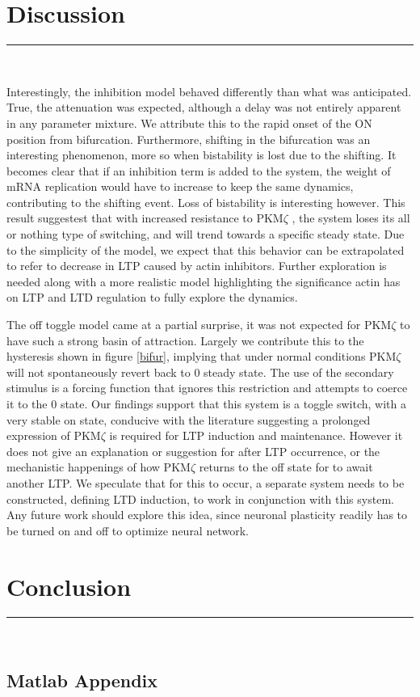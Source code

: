 \documentclass[12pt, a4paper]{article}
\newcommand{\blackbar}{{\nointerlineskip
{\rule{\linewidth}{1mm}}\\}}
\newcommand{\PK}{PKM$\zeta$ }
\newcommand{\insertMatlab}[1]{}
\begin{document}
\section*{Discussion}
\blackbar

Interestingly, the inhibition model behaved differently than what was anticipated. True, the attenuation was expected, although a delay was not entirely apparent in any parameter mixture. We attribute this to the rapid onset of the ON position from bifurcation. Furthermore, shifting in the bifurcation was an interesting phenomenon, more so when bistability is lost due to the shifting. It becomes clear that if an inhibition term is added to the system, the weight of mRNA replication would have to increase to keep the same dynamics, contributing to the shifting event. Loss of bistability is interesting however. This result suggestest that with increased resistance to \PK, the system loses its all or nothing type of switching, and will trend towards a specific steady state. Due to the simplicity of the model, we expect that this behavior can be extrapolated to refer to decrease in LTP caused by actin inhibitors. Further exploration is needed along with a more realistic model highlighting the significance actin has on LTP and LTD regulation to fully explore the dynamics. 

The off toggle model came at a partial surprise, it was not expected for \PK to have such a strong basin of attraction. Largely we contribute this to the hysteresis shown in figure \ref{bifur}, implying that under normal conditions \PK will not spontaneously revert back to 0 steady state. The use of the secondary stimulus is a forcing function that ignores this restriction and attempts to coerce it to the 0 state. Our findings support that this system is a toggle switch, with a very stable on state, conducive with the literature suggesting a prolonged expression of \PK is required for LTP induction and maintenance. However it does not give an explanation or suggestion for after LTP occurrence, or the mechanistic happenings of how \PK returns to the off state for to await another LTP. We speculate that for this to occur, a separate system needs to be constructed, defining LTD induction, to work in conjunction with this system. Any future work should explore this idea, since neuronal plasticity readily has to be turned on and off to optimize neural network.  


\section*{Conclusion}
\blackbar



\newpage
\begin{singlespace}
\printbibliography
\newpage
\section*{Matlab Appendix}
\insertMatlab{amath423Final.m}
\insertMatlab{computeSSNew.m}
\insertMatlab{neuronFireODE.m}
\insertMatlab{neuronFireODENewTerm.m}
\end{singlespace}
\end{document}
